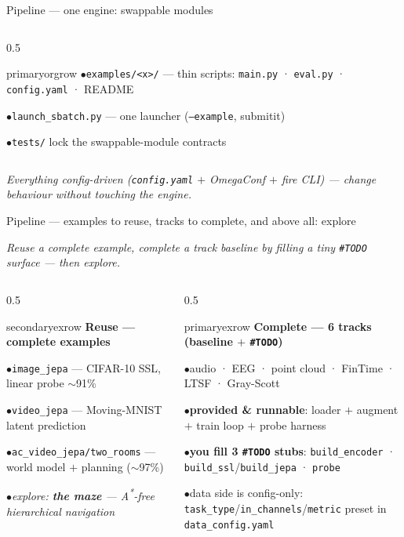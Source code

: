 \documentclass[aspectratio=169]{beamer}
\newcommand{\cardtitle}[2]{\textbf{\color{#1}#2}\par\vspace{5pt}}
\newcommand{\qitem}[1]{\textcolor{secondary}{\footnotesize$\bullet$}\hspace{4pt}#1\par\vspace{3pt}}
\begin{document}
\begin{frame}{Pipeline — one engine: swappable modules}
\begin{columns}[T]
\begin{column}{0.5\textwidth}
\begin{qbox}{primary}{orgrow}
        \qitem{\texttt{examples/<x>/} — thin scripts: \texttt{main.py} · \texttt{eval.py} · \texttt{config.yaml} · README}
        \qitem{\texttt{launch\_sbatch.py} — one launcher (\texttt{--example}, submitit)}
        \qitem{\texttt{tests/} lock the swappable-module contracts}
      \end{qbox}
    \end{column}
  \end{columns}
  \vspace{0.1cm}
  \begin{center}\scriptsize\itshape Everything config-driven (\texttt{config.yaml} $+$ OmegaConf $+$ fire CLI) — change behaviour without touching the engine.\end{center}
\end{frame}

\begin{frame}{Pipeline — examples to reuse, tracks to complete, and above all: explore}
  \begin{center}\small\itshape Reuse a complete example, complete a track baseline by filling a tiny \texttt{\#TODO} surface — then explore.\end{center}
  \vspace{0.18cm}
  \begin{columns}[T]
    \begin{column}{0.5\textwidth}
      \begin{qbox}{secondary}{exrow}
        \cardtitle{secondary}{Reuse — complete examples}
        \footnotesize
        \qitem{\texttt{image\_jepa} — CIFAR-10 SSL, linear probe $\sim$91\%}
        \qitem{\texttt{video\_jepa} — Moving-MNIST latent prediction}
        \qitem{\texttt{ac\_video\_jepa/two\_rooms} — world model $+$ planning ($\sim$97\%)}
        \qitem{\itshape explore: \textbf{the maze} — A\textsuperscript{*}-free hierarchical navigation}
      \end{qbox}
    \end{column}
    \begin{column}{0.5\textwidth}
      \begin{qbox}{primary}{exrow}
        \cardtitle{primary}{Complete — 6 tracks (baseline $+$ \texttt{\#TODO})}
        \footnotesize
        \qitem{audio · EEG · point cloud · FinTime · LTSF · Gray-Scott}
        \qitem{\textbf{provided \& runnable}: loader $+$ augment $+$ train loop $+$ probe harness}
        \qitem{\textbf{you fill 3 \texttt{\#TODO} stubs}: \texttt{build\_encoder} · \texttt{build\_ssl}/\texttt{build\_jepa} · \texttt{probe}}
        \qitem{data side is config-only: \texttt{task\_type}/\texttt{in\_channels}/\texttt{metric} preset in \texttt{data\_config.yaml}}

\end{qbox}
\end{column}
\end{columns}
\end{frame}
\end{document}
